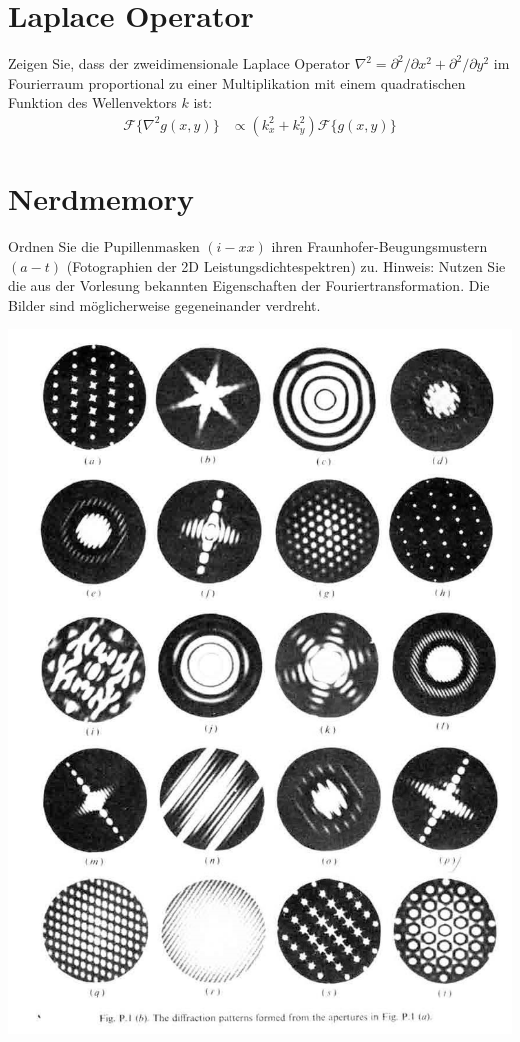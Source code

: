 \documentclass{article}
\begin{document}
\section{Laplace Operator}
Zeigen Sie, dass der zweidimensionale Laplace Operator $\nabla^2 =
\partial^2/\partial x^2 + \partial^2/\partial y^2$ im Fourierraum
proportional zu einer Multiplikation mit einem quadratischen Funktion
des Wellenvektors $k$ ist:
\begin{align}
  \mathcal{F}\{\nabla^2 g(x,y)\} &\propto (k_x^2+k_y^2) \mathcal{F}\{g(x,y)\}
\end{align}

\section{Nerdmemory}
Ordnen Sie die Pupillenmasken $(i-xx)$ ihren Fraunhofer-Beugungsmustern $(a-t)$
(Fotographien der 2D Leistungsdichtespektren) zu. Hinweis: Nutzen Sie die
aus der Vorlesung bekannten Eigenschaften der
Fouriertransformation. Die Bilder sind m\"oglicherweise gegeneinander
verdreht.

\includegraphics[height=.72\textheight, angle=90]{FrequencySpace}
\end{document}
